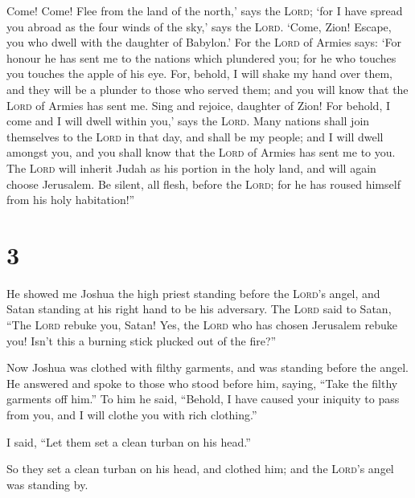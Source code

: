  Come! Come! Flee from the land of the north,' says the
\textsc{Lord}; `for I have spread you abroad as the four winds of the
sky,' says the \textsc{Lord}.  `Come, Zion! Escape, you
who dwell with the daughter of Babylon.'  For the
\textsc{Lord} of Armies says: `For honour he has sent me to the nations
which plundered you; for he who touches you touches the apple of his
eye.  For, behold, I will shake my hand over them, and
they will be a plunder to those who served them; and you will know that
the \textsc{Lord} of Armies has sent me.  Sing and
rejoice, daughter of Zion! For behold, I come and I will dwell within
you,' says the \textsc{Lord}.  Many nations shall join
themselves to the \textsc{Lord} in that day, and shall be my people; and
I will dwell amongst you, and you shall know that the \textsc{Lord} of
Armies has sent me to you.  The \textsc{Lord} will
inherit Judah as his portion in the holy land, and will again choose
Jerusalem.  Be silent, all flesh, before the
\textsc{Lord}; for he has roused himself from his holy habitation!''

\hypertarget{section-2}{%
\section{3}\label{section-2}}

 He showed me Joshua the high priest standing before the
\textsc{Lord}'s angel, and Satan standing at his right hand to be his
adversary.  The \textsc{Lord} said to Satan, ``The
\textsc{Lord} rebuke you, Satan! Yes, the \textsc{Lord} who has chosen
Jerusalem rebuke you! Isn't this a burning stick plucked out of the
fire?''

 Now Joshua was clothed with filthy garments, and was
standing before the angel.  He answered and spoke to those
who stood before him, saying, ``Take the filthy garments off him.'' To
him he said, ``Behold, I have caused your iniquity to pass from you, and
I will clothe you with rich clothing.''

 I said, ``Let them set a clean turban on his head.''

So they set a clean turban on his head, and clothed him; and the
\textsc{Lord}'s angel was standing by.

